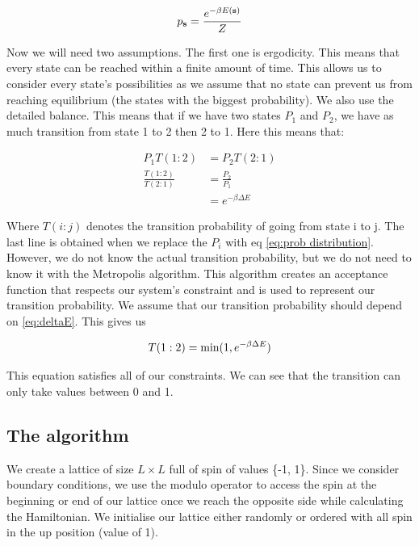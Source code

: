 \documentclass[english,notitlepage,reprint,nofootinbib]{revtex4-2}  %
\begin{document}
	\begin{equation}
		p_{\rm \textbf{s}} = \frac{e^{-\beta E(\textbf{s})}}{Z} \label{eq:prob distribution}
	\end{equation}


	Now we will need two assumptions. The first one is ergodicity. This means that every state
	can be reached within a finite amount of time. This allows us to consider every state's possibilities
	as we assume that no state can prevent us from reaching equilibrium (the states
	with the biggest probability). We also use the detailed balance. This means that if we have
	two states $P_1$ and $P_2$, we have as much transition from state 1 to 2 then 2 to 1. Here
	this means that:

	\begin{align}
		P_1 T(1:2) &= P_2T(2:1) \\
		\frac{T(1:2)}{T(2:1)} &= \frac{P_2}{P_1} \\
		&= e^{-\beta \Delta E} \label{eq:deltaE}
	\end{align}

	Where $T(i:j)$ denotes the transition probability of going from state i to j. The last line
	is obtained when we replace the $P_i$ with eq \ref{eq:prob distribution}. \\

	However, we do not know the actual transition probability, but we do not need to know
	it with the Metropolis algorithm. This algorithm creates an acceptance function that respects
	our system's constraint and is used to represent our transition probability. We assume
	that our transition probability should depend on \ref{eq:deltaE}. This gives us

	\begin{equation}
		T(1:2) = \text{min}(1, e^{-\beta \Delta E\\}) \label{eq:metropolis}
	\end{equation}


	This equation satisfies all of our constraints. We can see that the transition can only
	take values between 0 and 1.

	\subsection*{The algorithm}\label{subsec:you suck eloi}

	We create a lattice of size $L \times L $ full of spin of values \{-1, 1\}. Since we
	consider boundary conditions, we use the modulo operator to access the spin at the beginning
	or end of our lattice once we reach the opposite side while calculating the Hamiltonian. We
	initialise our lattice either randomly or ordered with all spin in the up position (value
	of 1). \\
\end{document}
